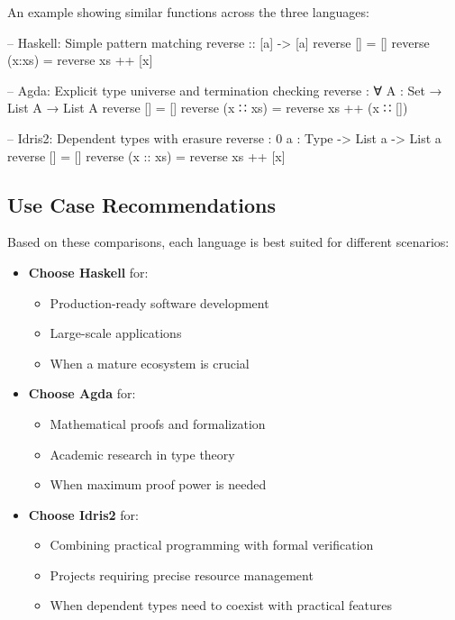 \documentclass[]{rptuseminar}
\begin{document}
An example showing similar functions across the three languages:  

\begin{haskell}  
-- Haskell: Simple pattern matching  
reverse :: [a] -> [a]  
reverse [] = []  
reverse (x:xs) = reverse xs ++ [x]  
\end{haskell}  

\begin{agda}
-- Agda: Explicit type universe and termination checking  
reverse : ∀ {A : Set} → List A → List A  
reverse []       = []  
reverse (x ∷ xs) = reverse xs ++ (x ∷ [])  
\end{agda}
\begin{idris}
-- Idris2: Dependent types with erasure  
reverse : {0 a : Type} -> List a -> List a  
reverse [] = []  
reverse (x :: xs) = reverse xs ++ [x]  
\end{idris}  

\subsection{Use Case Recommendations}  
Based on these comparisons, each language is best suited for different scenarios:  

\begin{itemize}  
    \item \textbf{Choose Haskell} for:  
        \begin{itemize}  
            \item Production-ready software development  
            \item Large-scale applications  
            \item When a mature ecosystem is crucial  
        \end{itemize}  
    
    \item \textbf{Choose Agda} for:  
        \begin{itemize}  
            \item Mathematical proofs and formalization  
            \item Academic research in type theory  
            \item When maximum proof power is needed  
        \end{itemize}  
    
    \item \textbf{Choose Idris2} for:  
        \begin{itemize}  
            \item Combining practical programming with formal verification  
            \item Projects requiring precise resource management  
            \item When dependent types need to coexist with practical features  
        \end{itemize}  
\end{itemize}
\end{document}

